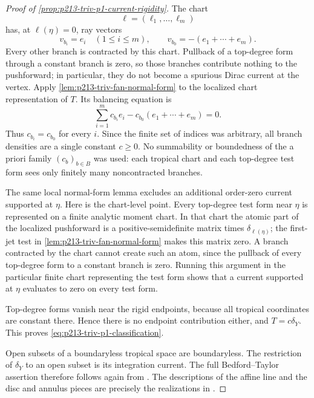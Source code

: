 \begin{proof}[Proof of \cref{prop:p213-triv-p1-current-rigidity}]
The chart
\[
             \ell=(\ell_1,\ldots,\ell_m)
\]
has, at $\ell(\eta)=0$, ray vectors
\begin{equation}
       v_{b_i}=e_i\quad(1\leq i\leq m),
       \qquad
       v_{b_0}=-(e_1+\cdots+e_m).
\label{eq:p213-triv-simplex-rays}
\end{equation}
Every other branch is contracted by this chart.  Pullback of a top-degree
form through a constant branch is zero, so those branches contribute
nothing to the pushforward; in particular, they do not become a spurious
Dirac current at the vertex.  Apply
\cref{lem:p213-triv-fan-normal-form} to the localized chart representation
of \(T\).
Its balancing equation is
\begin{equation}
       \sum_{i=1}^mc_{b_i}e_i
          -c_{b_0}(e_1+\cdots+e_m)=0.
\label{eq:p213-triv-simplex-balance}
\end{equation}
Thus \(c_{b_i}=c_{b_0}\) for every \(i\).  Since the finite set of indices
was arbitrary, all branch densities are a single constant \(c\geq0\).  No
summability or boundedness of the a priori family \((c_b)_{b\in B}\) was
used: each tropical chart and each top-degree test form sees only finitely
many noncontracted branches.

The same local normal-form lemma excludes an additional order-zero current
supported at \(\eta\).  Here is the chart-level point.  Every top-degree test
form near \(\eta\) is represented on a finite analytic moment chart.  In
that chart the atomic part of the localized pushforward is a
positive-semidefinite matrix times \(\delta_{\ell(\eta)}\); the first-jet
test in \cref{lem:p213-triv-fan-normal-form} makes this matrix zero.  A
branch contracted by the chart cannot create such an atom, since the
pullback of every top-degree form to a constant branch is zero.  Running
this argument in the particular finite chart representing the test form
shows that a current supported at \(\eta\) evaluates to zero on every test
form.

Top-degree forms vanish near the rigid endpoints, because all tropical
coordinates are constant there.  Hence there is no endpoint contribution
either, and \(T=c\delta_Y\).  This proves
\eqref{eq:p213-triv-p1-classification}.

Open subsets of a boundaryless tropical space are boundaryless.  The
restriction of $\delta_Y$ to an open subset is its integration current.
The full Bedford--Taylor assertion therefore follows again from
\cite[Example~8.6.4]{CLD25}.  The descriptions of the affine line and the
disc and annulus pieces are precisely the realizations in
\cite[\S\S6.7.1--6.7.3]{CLD25}.
\end{proof}

